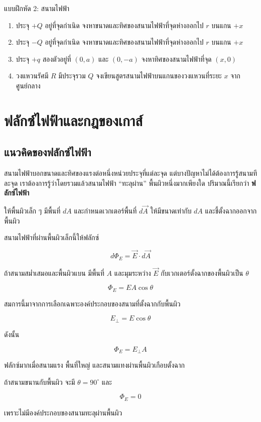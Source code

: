 \begin{exercisebox}{แบบฝึกหัด 2: สนามไฟฟ้า}
\begin{enumerate}
    \item ประจุ $+Q$ อยู่ที่จุดกำเนิด จงหาขนาดและทิศของสนามไฟฟ้าที่จุดห่างออกไป $r$ บนแกน $+x$
    \item ประจุ $-Q$ อยู่ที่จุดกำเนิด จงหาขนาดและทิศของสนามไฟฟ้าที่จุดห่างออกไป $r$ บนแกน $+x$
    \item ประจุ $+q$ สองตัวอยู่ที่ $(0,a)$ และ $(0,-a)$ จงหาทิศของสนามไฟฟ้าที่จุด $(x,0)$
    \item วงแหวนรัศมี $R$ มีประจุรวม $Q$ จงเขียนสูตรสนามไฟฟ้าบนแกนของวงแหวนที่ระยะ $x$ จากศูนย์กลาง
\end{enumerate}
\end{exercisebox}

\section{ฟลักซ์ไฟฟ้าและกฎของเกาส์}

\subsection{แนวคิดของฟลักซ์ไฟฟ้า}

สนามไฟฟ้าบอกขนาดและทิศของแรงต่อหนึ่งหน่วยประจุที่แต่ละจุด แต่บางปัญหาไม่ได้ต้องการรู้สนามทีละจุด เราต้องการรู้ว่าโดยรวมแล้วสนามไฟฟ้า ``ทะลุผ่าน'' พื้นผิวหนึ่งมากเพียงใด ปริมาณนี้เรียกว่า \textbf{ฟลักซ์ไฟฟ้า}

ให้พื้นผิวเล็ก ๆ มีพื้นที่ $dA$ และกำหนดเวกเตอร์พื้นที่ $d\vec{A}$ ให้มีขนาดเท่ากับ $dA$ และชี้ตั้งฉากออกจากพื้นผิว

สนามไฟฟ้าที่ผ่านพื้นผิวเล็กนี้ให้ฟลักซ์

\[
d\Phi_E=\vec{E}\cdot d\vec{A}
\]

ถ้าสนามสม่ำเสมอและพื้นผิวแบน มีพื้นที่ $A$ และมุมระหว่าง $\vec{E}$ กับเวกเตอร์ตั้งฉากของพื้นผิวเป็น $\theta$

\[
\Phi_E=EA\cos\theta
\]

สมการนี้มาจากการเลือกเฉพาะองค์ประกอบของสนามที่ตั้งฉากกับพื้นผิว

\[
E_\perp=E\cos\theta
\]

ดังนั้น

\[
\Phi_E=E_\perp A
\]

\begin{tcolorbox}[title=ความหมายเชิงภาพของฟลักซ์]
ฟลักซ์มากเมื่อสนามแรง พื้นที่ใหญ่ และสนามแทงผ่านพื้นผิวเกือบตั้งฉาก

ถ้าสนามขนานกับพื้นผิว จะมี $\theta=90^\circ$ และ

\[
\Phi_E=0
\]

เพราะไม่มีองค์ประกอบของสนามทะลุผ่านพื้นผิว
\end{tcolorbox}

